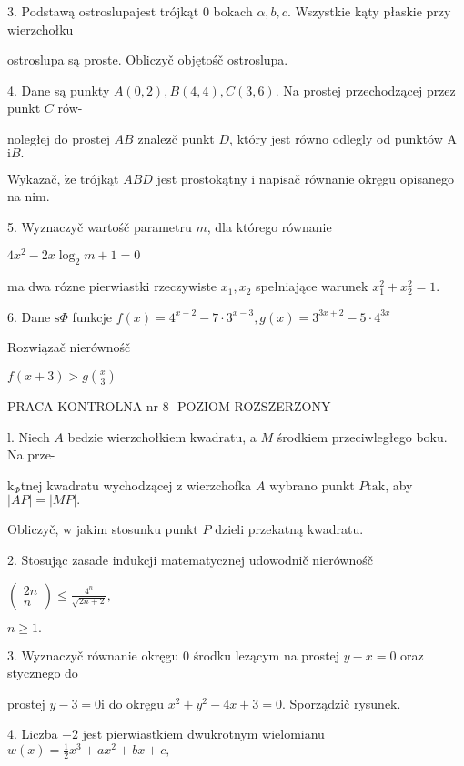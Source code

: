 \documentclass[a4paper,12pt]{article}
\begin{document}
3. Podstawą ostroslupajest trójkąt $0$ bokach $\alpha, b, c$. Wszystkie kąty płaskie przy wierzchołku

ostroslupa są proste. Obliczyč objętośč ostroslupa.

4. Dane są punkty $A(0,2), B(4,4), C(3,6)$. Na prostej przechodzącej przez punkt $C$ rów-

noległej do prostej $AB$ znalez$\acute{}$č punkt $D$, który jest równo odlegly od punktów A $\mathrm{i}B.$

Wykazač, $\dot{\mathrm{z}}\mathrm{e}$ trójkąt $ABD$ jest prostokątny $\mathrm{i}$ napisač równanie okręgu opisanego na nim.

5. Wyznaczyč wartośč parametru $m$, dla którego równanie

$4x^{2}-2x\log_{2}m+1=0$

ma dwa rózne pierwiastki rzeczywiste $x_{1}, x_{2}$ spełniające warunek $x_{1}^{2}+x_{2}^{2}=1.$

6. Dane $\mathrm{s}\Phi$ funkcje $f(x)=4^{x-2}-7\cdot 3^{x-3}, g(x)=3^{3x+2}-5\cdot 4^{3x}$

Rozwiązač nierównośč

$f(x+3)>g(\displaystyle \frac{x}{3})$





PRACA KONTROLNA nr 8- POZIOM ROZSZERZONY

l. Niech $A$ bedzie wierzchołkiem kwadratu, a $M$ środkiem przeciwległego boku. Na prze-

$\mathrm{k}_{\Phi}$tnej kwadratu wychodzącej $\mathrm{z}$ wierzchofka $A$ wybrano punkt $P\mathrm{t}\mathrm{a}\mathrm{k}$, aby $|AP|=|MP|.$

Obliczyč, $\mathrm{w}$ jakim stosunku punkt $P$ dzieli przekatną kwadratu.

2. Stosując zasade indukcji matematycznej udowodnič nierównośč

$\left(\begin{array}{l}
2n\\
n
\end{array}\right) \displaystyle \leq\frac{4^{n}}{\sqrt{2n+2}},$

$n\geq 1.$

3. Wyznaczyč równanie okręgu $0$ środku lezącym na prostej $y-x=0$ oraz stycznego do

prostej $y-3=0\mathrm{i}$ do okręgu $x^{2}+y^{2}-4x+3=0$. Sporządzič rysunek.

4. Liczba $-2$ jest pierwiastkiem dwukrotnym wielomianu $w(x) = \displaystyle \frac{1}{2}x^{3}+ax^{2}+bx+c,$
\end{document}
